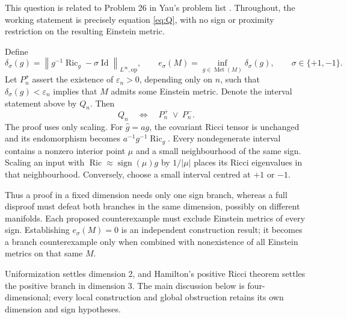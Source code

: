 \documentclass[a4paper,11pt]{article}
\numberwithin{equation}{section}
\theoremstyle{definition}
\newcommand{\Ric}{\operatorname{Ric}}
\newcommand{\Met}{\operatorname{Met}}
\newcommand{\Id}{\operatorname{Id}}
\newcommand{\op}{\mathrm{op}}
\newcommand{\norm}[1]{\left\lVert#1\right\rVert}
\begin{document}
This question is related to Problem 26 in Yau's problem list \cite{Yau1982}. Throughout, the working statement is precisely equation \eqref{eq:Q}, with no sign or proximity restriction on the resulting Einstein metric.

Define
\begin{equation}\label{eq:defect}
 \delta_\sigma(g)=\norm{g^{-1}\Ric_g-\sigma\Id}_{L^\infty,\op},\qquad
 e_\sigma(M)=\inf_{g\in\Met(M)}\delta_\sigma(g),\qquad \sigma\in\{+1,-1\}.
\end{equation}
Let $P_n^\sigma$ assert the existence of $\varepsilon_n>0$, depending only on $n$, such that $\delta_\sigma(g)<\varepsilon_n$ implies that $M$ admits some Einstein metric. Denote the interval statement above by $Q_n$. Then
\begin{equation}\label{eq:branches}
 Q_n\quad\Longleftrightarrow\quad P_n^+\ \lor\ P_n^-.
\end{equation}
The proof uses only scaling. For $\widehat g=ag$, the covariant Ricci tensor is unchanged and its endomorphism becomes $a^{-1}g^{-1}\Ric_g$. Every nondegenerate interval contains a nonzero interior point $\mu$ and a small neighbourhood of the same sign. Scaling an input with $\Ric\approx\operatorname{sign}(\mu)g$ by $1/|\mu|$ places its Ricci eigenvalues in that neighbourhood. Conversely, choose a small interval centred at $+1$ or $-1$.

Thus a proof in a fixed dimension needs only one sign branch, whereas a full disproof must defeat both branches in the same dimension, possibly on different manifolds. Each proposed counterexample must exclude Einstein metrics of every sign. Establishing $e_\sigma(M)=0$ is an independent construction result; it becomes a branch counterexample only when combined with nonexistence of all Einstein metrics on that same $M$.

Uniformization settles dimension 2, and Hamilton's positive Ricci theorem settles the positive branch in dimension 3. The main discussion below is four-dimensional; every local construction and global obstruction retains its own dimension and sign hypotheses.
\end{document}
